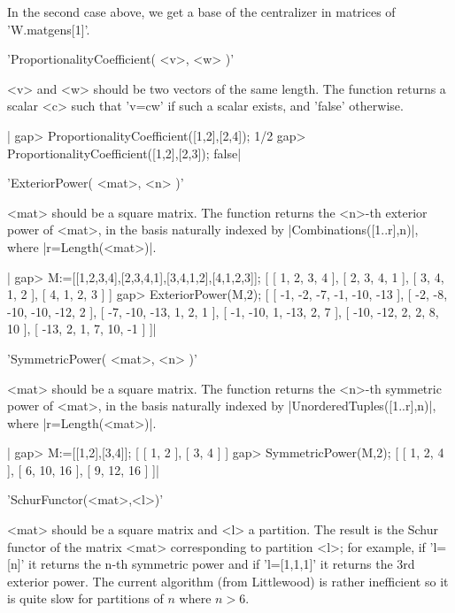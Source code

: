 In  the second case above, we get a  base of the centralizer in matrices of
'W.matgens[1]'.


'ProportionalityCoefficient( <v>, <w> )'

<v>  and <w>  should be  two vectors  of the  same length.  The function
returns  a scalar <c>  such that 'v=c\*w'  if such a  scalar exists, and
'false' otherwise.

|    gap> ProportionalityCoefficient([1,2],[2,4]);
    1/2
    gap> ProportionalityCoefficient([1,2],[2,3]);
    false|


'ExteriorPower( <mat>, <n> )'

<mat>  should be  a square  matrix. The  function returns  the <n>-th exterior
power  of <mat>, in  the basis naturally  indexed by |Combinations([1..r],n)|,
where |r=Length(<mat>)|.

|    gap> M:=[[1,2,3,4],[2,3,4,1],[3,4,1,2],[4,1,2,3]];
    [ [ 1, 2, 3, 4 ], [ 2, 3, 4, 1 ], [ 3, 4, 1, 2 ], [ 4, 1, 2, 3 ] ]
    gap> ExteriorPower(M,2);
    [ [ -1, -2, -7, -1, -10, -13 ], [ -2, -8, -10, -10, -12, 2 ],
      [ -7, -10, -13, 1, 2, 1 ], [ -1, -10, 1, -13, 2, 7 ],
      [ -10, -12, 2, 2, 8, 10 ], [ -13, 2, 1, 7, 10, -1 ] ]|


'SymmetricPower( <mat>, <n> )'

<mat>  should be  a square  matrix. The  function returns the <n>-th symmetric
power of <mat>, in the basis naturally indexed by |UnorderedTuples([1..r],n)|,
where |r=Length(<mat>)|.

|    gap> M:=[[1,2],[3,4]];
    [ [ 1, 2 ], [ 3, 4 ] ]
    gap> SymmetricPower(M,2);
    [ [ 1, 2, 4 ], [ 6, 10, 16 ], [ 9, 12, 16 ] ]|


'SchurFunctor(<mat>,<l>)'

<mat>  should be  a square  matrix and  <l> a  partition. The result is the
Schur  functor  of  the  matrix  <mat>  corresponding to partition <l>; for
example,  if 'l=[n]' it returns the n-th symmetric power and if 'l=[1,1,1]'
it  returns the 3rd exterior power. The current algorithm (from Littlewood)
is rather inefficient so it is quite slow for partitions of $n$ where $n>6$.

